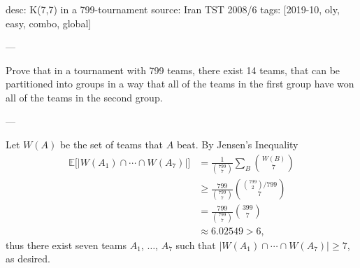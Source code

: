 desc: K(7,7) in a 799-tournament
source: Iran TST 2008/6
tags: [2019-10, oly, easy, combo, global]

---

Prove that in a tournament with 799 teams, there exist 14 teams, that can be partitioned into groups in a way that all of the teams in the first group have won all of the teams in the second group.

---

Let $W(A)$ be the set of teams that $A$ beat. By Jensen's Inequality
\begin{align*}
    \mathbb E\Big[\big\lvert W(A_1)\cap\cdots\cap W(A_7)\big\rvert\Big]&=\frac1{\binom{799}7}\sum_B\binom{W(B)}7\\
    &\ge\frac{799}{\binom{799}7}\binom{\binom{799}2/799}7\\
    &=\frac{799}{\binom{799}7}\binom{399}7\\
    &\approx6.02549>6,
\end{align*}
thus there exist seven teams $A_1$, $\ldots$, $A_7$ such that $\big\lvert W(A_1)\cap\cdots\cap W(A_7)\big\rvert\ge7$, as desired.
